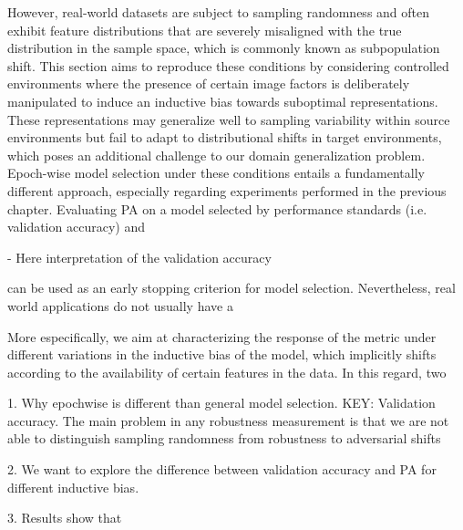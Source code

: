 However, real-world datasets are subject to sampling randomness and often exhibit feature
distributions that are severely misaligned with the true distribution in the sample space, 
which is commonly known as subpopulation shift. This section aims to reproduce these conditions 
by considering controlled environments where the presence of certain image factors is deliberately 
manipulated to induce an inductive bias towards suboptimal representations. These representations 
may generalize well to sampling variability within source environments but fail to adapt to 
distributional shifts in target environments, which poses an additional challenge to
our domain generalization problem. \\

Epoch-wise model selection under these conditions entails a fundamentally different approach,
especially regarding experiments performed in the previous chapter. Evaluating PA on a model
selected by performance standards (i.e. validation accuracy) and 

- Here interpretation of the validation accuracy 



can be used as an early stopping criterion
for model selection. Nevertheless, real world applications do not usually have a 



More especifically,
we aim at characterizing the response of the metric under different variations in the inductive
bias of the model, which implicitly shifts according to the availability of certain features
in the data. In this regard, two 

1. Why epochwise is different than general model selection. KEY: Validation accuracy. The
main problem in any robustness measurement is that we are not able to distinguish sampling
randomness from robustness to adversarial shifts


2. We want to explore the difference between validation accuracy and PA for different inductive
bias.



3. Results show that


